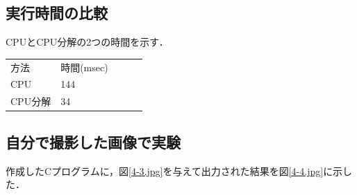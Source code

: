 \documentclass[11pt]{jarticle}
\begin{document}
\subsection{実行時間の比較}
CPUとCPU分解の2つの時間を示す．
\begin{table}[h]
    \centering
    \begin{tabular}{l|llll}
    \cline{1-2}
    方法    & 時間(msec) &  &  &  \\ \cline{1-2}
    CPU   & 144      &  &  &  \\
    CPU分解 & 34       &  &  &  \\ \cline{1-2}
    \end{tabular}
    \end{table}

\subsection{自分で撮影した画像で実験}
作成したCプログラムに，図\ref{4-3.jpg}を与えて出力された結果を図\ref{4-4.jpg}に示した．
\end{document}
